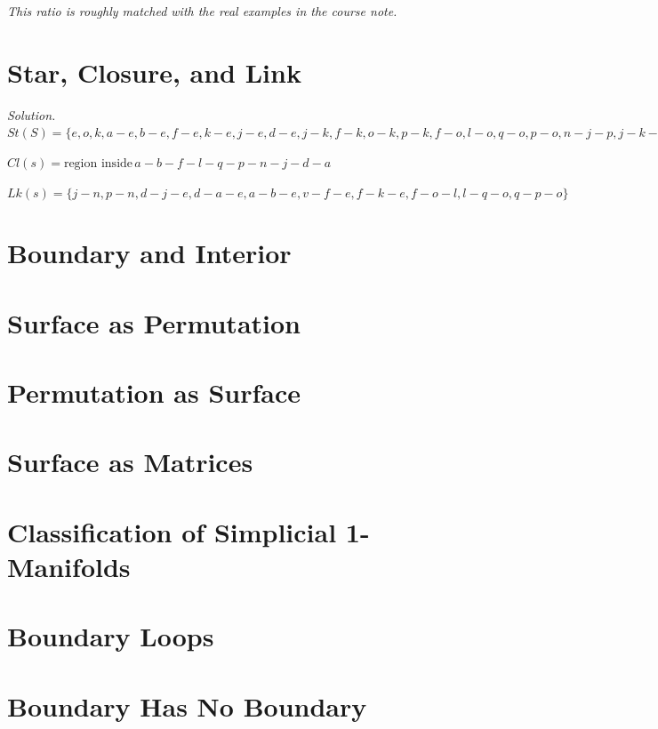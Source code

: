 \emph{This ratio is roughly matched with the real examples in the course note.}

\section{Star, Closure, and Link}

\emph{Solution.} $St(S) = \{
    e, o, k,
    a-e, b-e, f-e, k-e, j-e, d-e,
    j-k, f-k, o-k, p-k,
    f-o, l-o, q-o,p-o,
    n-j-p, j-k-p
\}$

$Cl(s) = \text{region inside}\,a-b-f-l-q-p-n-j-d-a$

$Lk(s) = \{
    j-n, p-n,
    d-j-e, d-a-e, a-b-e, v-f-e, f-k-e, f-o-l, l-q-o, q-p-o
\}$

\section{Boundary and Interior}

\section{Surface as Permutation}

\section{Permutation as Surface}

\section{Surface as Matrices}

\section{Classiﬁcation of Simplicial 1-Manifolds}

\section{Boundary Loops}

\section{Boundary Has No Boundary}

